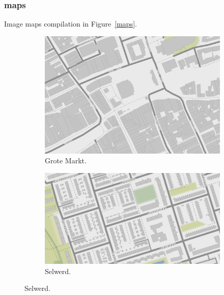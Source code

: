 \subsubsection{maps}
Image maps compilation in Figure~\ref{maps}.

\begin{figure}[htbp]
\begin{subfigure}{.5\textwidth}
\includegraphics[width=\linewidth]{../experiments/GroteMarktMaps/maps/groteMarkt.png}
\caption{Grote Markt.}
\end{subfigure}
\begin{subfigure}{.5\textwidth}

\includegraphics[width=\linewidth]{../experiments/GroteMarktMaps/maps/Selwerd.png}
\caption{Selwerd.}
\end{subfigure}


\end{figure}
